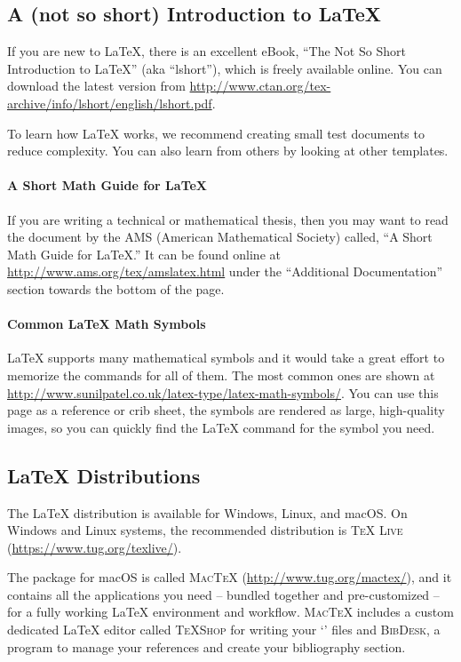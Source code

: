 \subsection{A (not so short) Introduction to LaTeX}

If you are new to LaTeX, there is an excellent eBook, \enquote{The Not So Short Introduction to LaTeX} (aka ``lshort''), which is freely available online. You can download the latest version from
\url{http://www.ctan.org/tex-archive/info/lshort/english/lshort.pdf}.

To learn how LaTeX works, we recommend creating small test documents to reduce complexity. You can also learn from others by looking at other templates.

\paragraph{A Short Math Guide for LaTeX}

If you are writing a technical or mathematical thesis, then you may want to read the document by the AMS (American Mathematical Society) called, \enquote{A Short Math Guide for LaTeX.} It can be found online at
\url{http://www.ams.org/tex/amslatex.html}
under the \enquote{Additional Documentation} section towards the bottom of the page.

\paragraph{Common LaTeX Math Symbols}
LaTeX supports many mathematical symbols and it would take a great effort to memorize the commands for all of them. The most common ones are shown at
\url{http://www.sunilpatel.co.uk/latex-type/latex-math-symbols/}.
You can use this page as a reference or crib sheet, the symbols are rendered as large, high-quality images, so you can quickly find the LaTeX command for the symbol you need.

\subsection{LaTeX Distributions}

The LaTeX distribution is available for Windows, Linux, and macOS\@.
On Windows and Linux systems, the recommended distribution is \textsc{TeX Live} (\url{https://www.tug.org/texlive/}).

The package for macOS is called \textsc{MacTeX} (\url{http://www.tug.org/mactex/}), and it contains all the applications you need -- bundled together and pre-customized -- for a fully working LaTeX environment and workflow. \textsc{MacTeX} includes a custom dedicated LaTeX editor called \textsc{TeXShop} for writing your `' files and \textsc{BibDesk}, a program to manage your references and create your bibliography section.



